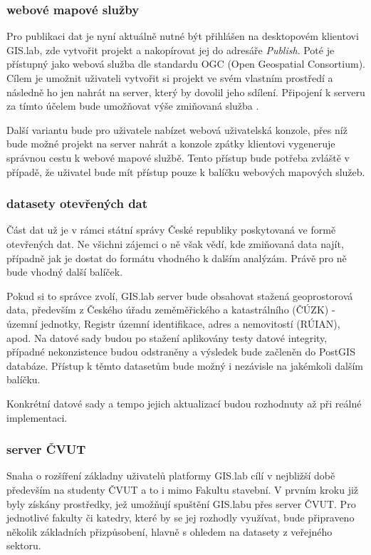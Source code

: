 \subsubsection{webové mapové služby}
Pro publikaci dat je nyní aktuálně nutné být přihlášen na desktopovém klientovi GIS.lab, zde vytvořit projekt a nakopírovat jej do adresáře \textit{Publish}. Poté je přístupný jako webová služba dle standardu OGC (Open Geospatial Consortium). Cílem je umožnit uživateli vytvořit si projekt ve svém vlastním prostředí a následně ho jen nahrát na server, který by dovolil jeho sdílení. Připojení k serveru za tímto účelem bude umožňovat výše zmiňovaná služba . 

Další variantu bude pro uživatele nabízet webová uživatelská konzole, přes níž bude možné projekt na server nahrát a konzole zpátky klientovi vygeneruje správnou cestu k webové mapové službě. Tento přístup bude potřeba zvláště v případě, že uživatel bude mít přístup pouze k balíčku webových mapových služeb.

\subsubsection{datasety otevřených dat}

Část dat už je v rámci státní správy České republiky poskytovaná ve
formě otevřených dat. Ne všichni zájemci o ně však vědí, kde zmiňovaná
data najít, případně jak je dostat do formátu vhodného k dalším
analýzám. Právě pro ně bude vhodný další balíček.

Pokud si to správce zvolí, GIS.lab server bude obsahovat stažená
geoprostorová data, především z Českého úřadu zeměměřického a
katastrálního (ČÚZK) - územní jednotky, Registr územní identifikace,
adres a nemovitostí (RÚIAN), apod. Na datové sady budou po stažení
aplikovány testy datové integrity, případné nekonzistence budou
odstraněny a výsledek bude začleněn do PostGIS databáze. Přístup 
k těmto datasetům bude možný i nezávisle na jakémkoli dalším balíčku.

Konkrétní datové sady a tempo jejich aktualizací budou rozhodnuty až
při reálné implementaci.

\subsubsection{server ČVUT}
Snaha o rozšíření základny uživatelů platformy GIS.lab cílí v
nejbližší době především na studenty ČVUT a to i mimo Fakultu
stavební. V prvním kroku již byly získány prostředky, jež umožňují
spuštění GIS.labu přes server ČVUT. Pro jednotlivé fakulty či katedry,
které by se jej rozhodly využívat, bude připraveno několik základních
přizpůsobení, hlavně s ohledem na datasety z veřejného sektoru.

